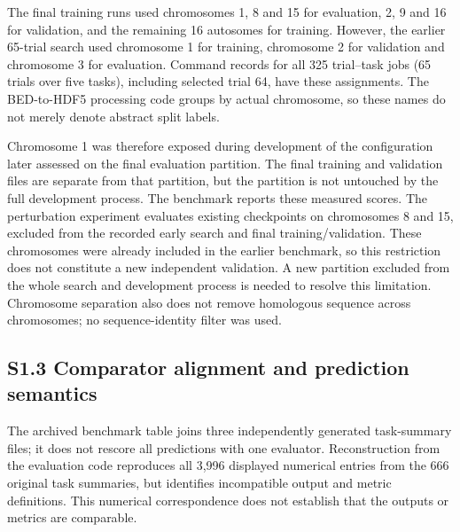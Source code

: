 \documentclass[11pt]{article}
\begin{document}
The final training runs used chromosomes 1, 8 and 15 for evaluation, 2, 9 and 16 for validation, and the remaining 16 autosomes for training. However, the earlier 65-trial search used chromosome 1 for training, chromosome 2 for validation and chromosome 3 for evaluation. Command records for all 325 trial--task jobs (65 trials over five tasks), including selected trial 64, have these assignments. The BED-to-HDF5 processing code groups by actual chromosome, so these names do not merely denote abstract split labels.

Chromosome 1 was therefore exposed during development of the configuration later assessed on the final evaluation partition. The final training and validation files are separate from that partition, but the partition is not untouched by the full development process. The benchmark reports these measured scores. The perturbation experiment evaluates existing checkpoints on chromosomes 8 and 15, excluded from the recorded early search and final training/validation. These chromosomes were already included in the earlier benchmark, so this restriction does not constitute a new independent validation. A new partition excluded from the whole search and development process is needed to resolve this limitation. Chromosome separation also does not remove homologous sequence across chromosomes; no sequence-identity filter was used.

\subsection*{S1.3 Comparator alignment and prediction semantics}

The archived benchmark table joins three independently generated task-summary files; it does not rescore all predictions with one evaluator. Reconstruction from the evaluation code reproduces all 3,996 displayed numerical entries from the 666 original task summaries, but identifies incompatible output and metric definitions. This numerical correspondence does not establish that the outputs or metrics are comparable.
\end{document}
